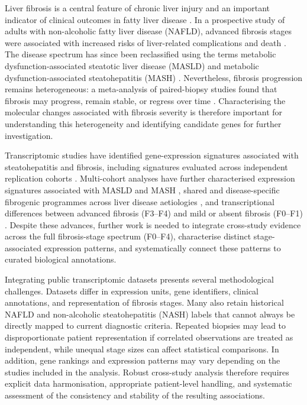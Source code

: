 \documentclass[11pt,a4paper]{article}
\begin{document}
Liver fibrosis is a central feature of chronic liver injury and an important indicator of clinical outcomes in fatty liver disease \cite{ref1}. In a prospective study of adults with non-alcoholic fatty liver disease (NAFLD), advanced fibrosis stages were associated with increased risks of liver-related complications and death \cite{ref2}. The disease spectrum has since been reclassified using the terms metabolic dysfunction-associated steatotic liver disease (MASLD) and metabolic dysfunction-associated steatohepatitis (MASH) \cite{ref3}. Nevertheless, fibrosis progression remains heterogeneous: a meta-analysis of paired-biopsy studies found that fibrosis may progress, remain stable, or regress over time \cite{singh2015}. Characterising the molecular changes associated with fibrosis severity is therefore important for understanding this heterogeneity and identifying candidate genes for further investigation.

Transcriptomic studies have identified gene-expression signatures associated with steatohepatitis and fibrosis, including signatures evaluated across independent replication cohorts \cite{govaere2020}. Multi-cohort analyses have further characterised expression signatures associated with MASLD and MASH \cite{piras2024}, shared and disease-specific fibrogenic programmes across liver disease aetiologies \cite{yang2026}, and transcriptional differences between advanced fibrosis (F3--F4) and mild or absent fibrosis (F0--F1) \cite{maiers2026}. Despite these advances, further work is needed to integrate cross-study evidence across the full fibrosis-stage spectrum (F0--F4), characterise distinct stage-associated expression patterns, and systematically connect these patterns to curated biological annotations.

Integrating public transcriptomic datasets presents several methodological challenges. Datasets differ in expression units, gene identifiers, clinical annotations, and representation of fibrosis stages. Many also retain historical NAFLD and non-alcoholic steatohepatitis (NASH) labels that cannot always be directly mapped to current diagnostic criteria. Repeated biopsies may lead to disproportionate patient representation if correlated observations are treated as independent, while unequal stage sizes can affect statistical comparisons. In addition, gene rankings and expression patterns may vary depending on the studies included in the analysis. Robust cross-study analysis therefore requires explicit data harmonisation, appropriate patient-level handling, and systematic assessment of the consistency and stability of the resulting associations.
\end{document}
